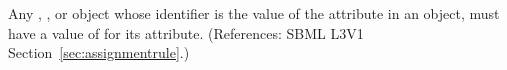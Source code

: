 Any \Compartment, \Species, \Parameter or \SpeciesReference object whose
identifier is the value of the attribute  in an
\AssignmentRule object, must have a value of  for its
 attribute.  (References: SBML L3V1
Section~\ref{sec:assignmentrule}.)

